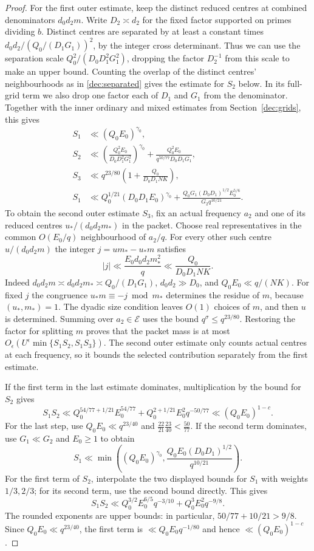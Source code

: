\documentclass[11pt,a4paper]{article}
\theoremstyle{paperplain}
\numberwithin{equation}{section}
\begin{document}
\begin{proof}
For the first outer estimate, keep the distinct reduced centres
at combined denominators $d_0d_2m$. Write $D_2\asymp d_2$ for
the fixed factor supported on primes dividing $b$. Distinct
centres are separated by at least a constant times
$d_0d_2/(Q_0/(D_1G_1))^2$, by the integer cross determinant.
Thus we can use the separation scale
$Q_0^2/(D_0D_1^2G_1^2)$, dropping the factor $D_2^{-1}$
from this scale to make an upper bound. Counting the overlap of
the distinct centres' neighbourhoods as in \eqref{dec:separated}
gives the estimate for $S_2$ below. In its full-grid term we also drop
one factor each of $D_1$ and $G_1$ from the denominator.
Together with the inner ordinary and mixed estimates from
Section~\ref{dec:grids}, this gives
\begin{align*}
 S_1&\ll(Q_0E_0)^{\gamma_0},\\
 S_2&\ll\left(\frac{Q_0^2E_0}{D_0D_1^2G_1^2}\right)^{\gamma_0}
       +\frac{Q_0^2E_0}{q^{50/77}D_0D_1G_1},\\
 S_3&\ll q^{23/80}\left(1+\frac{Q_0}{D_0D_1NK}\right),\\
 S_1&\ll Q_0^{1/21}(D_0D_1E_0)^{\gamma_0}
       +\frac{Q_0G_1(D_0D_1)^{1/2}E_0^{5/6}}{G_2q^{10/21}}.
\end{align*}
To obtain the second outer estimate $S_3$, fix an actual frequency
$a_2$ and one of its reduced centres $u_* /(d_0d_2m_*)$ in
the packet. Choose real representatives in the common
$O(E_0/q)$ neighbourhood of $a_2/q$. For every other such centre
$u/(d_0d_2m)$ the integer $j=um_*-u_*m$ satisfies
\[
 |j|\ll \frac{E_0d_0d_2m_*^2}{q}
 \ll \frac{Q_0}{D_0D_1 NK}.
\]
Indeed $d_0d_2m\asymp d_0d_2m_*\asymp Q_0/(D_1G_1)$,
$d_0d_2\gg D_0$, and $Q_0E_0\ll q/(NK)$.
For fixed $j$ the congruence $u_*m\equiv-j\bmod m_*$ determines
the residue of $m$, because $(u_*,m_*)=1$. The dyadic size condition
leaves $O(1)$ choices of $m$, and then $u$ is determined. Summing
over $a_2\in\mathcal E$ uses the bound $q^\sigma\le q^{23/80}$.
Restoring the factor for splitting $m$ proves that the packet
mass is at most
$O_\epsilon(U^\epsilon\min\{S_1S_2,S_1S_3\})$.
The second outer estimate only counts actual centres at each
frequency, so it bounds the selected contribution separately
from the first estimate.

If the first term in the last estimate dominates, multiplication
by the bound for $S_2$ gives
\[
 S_1S_2\ll
 Q_0^{54/77+1/21}E_0^{54/77}
 +Q_0^{2+1/21}E_0^2q^{-50/77}
 \ll(Q_0E_0)^{1-c}.
\]
For the last step, use $Q_0E_0\ll q^{23/40}$ and
$\frac{22}{21}\frac{23}{40}<\frac{50}{77}$.
If the second term dominates, use $G_1\ll G_2$ and $E_0\ge1$ to obtain
\[
 S_1\ll\min\left((Q_0E_0)^{\gamma_0},
          \frac{Q_0E_0(D_0D_1)^{1/2}}{q^{10/21}}\right).
\]
For the first term of $S_2$, interpolate the two displayed
bounds for $S_1$ with weights $1/3,2/3$; for its second term,
use the second bound directly. This gives
\[
 S_1S_2\ll Q_0^{3/2}E_0^{6/5}q^{-3/10}
                +Q_0^3E_0^2q^{-9/8}.
\]
The rounded exponents are upper bounds: in particular,
$50/77+10/21>9/8$.
Since $Q_0E_0\ll q^{23/40}$, the first term is
$\ll Q_0E_0q^{-1/80}$ and hence $\ll(Q_0E_0)^{1-c}$.


\end{proof}
\end{document}
